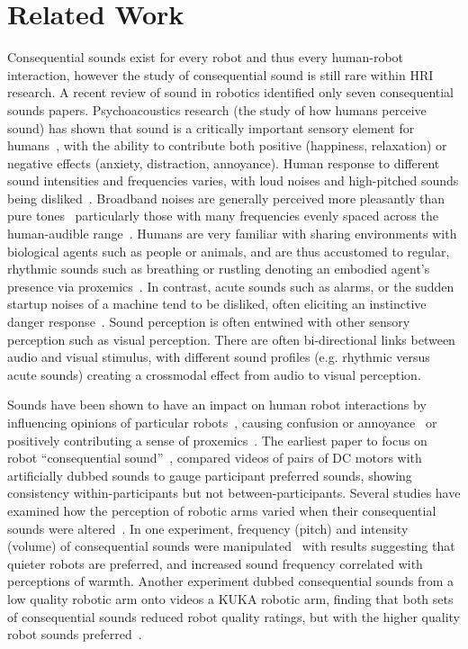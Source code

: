 \section{Related Work}
\label{sec:related-works}
Consequential sounds exist for every robot and thus every human-robot interaction, however the study of consequential sound is still rare within HRI research. A recent review of sound in robotics identified only seven consequential sounds papers\cite{Zhang2023}. Psychoacoustics research (the study of how humans perceive sound) has shown that sound is a critically important sensory element for humans~\cite{Jouaiti2019}, with the ability to contribute both positive (happiness, relaxation) or negative effects (anxiety, distraction, annoyance). Human response to different sound intensities and frequencies varies, with loud noises and high-pitched sounds being disliked~\cite{Cha2018}. Broadband noises are generally perceived more pleasantly than pure tones~\cite{Fastl2007a} particularly those with many frequencies evenly spaced across the human-audible range~\cite{Cha2018}. Humans are very familiar with sharing environments with biological agents such as people or animals, and are thus accustomed to regular, rhythmic sounds such as breathing or rustling denoting an embodied agent's presence via proxemics~\cite{Jouaiti2019,Trovato2018}. In contrast, acute sounds such as alarms, or the sudden startup noises of a machine tend to be disliked, often eliciting an instinctive danger response~\cite{Jouaiti2019}. Sound perception is often entwined with other sensory perception such as visual perception. There are often bi-directional links between audio and visual stimulus\cite{DeGelder2000}, with different sound profiles (e.g. rhythmic versus acute sounds) creating a crossmodal effect from audio to visual perception\cite{Vroomen2000}.

Sounds have been shown to have an impact on human robot interactions by influencing opinions of particular robots~\cite{Moore2018,Frederiksen2019,Frederiksen2020,Cha2018,Song2017}, causing confusion or annoyance~\cite{DePaivaVianna2015,Schute2007,Moore2017} or positively contributing a sense of proxemics~\cite{Cha2018,Trovato2018}. The earliest paper to focus on robot ``consequential sound''~\cite{Moore2017}, compared videos of pairs of DC motors with artificially dubbed sounds to gauge participant preferred sounds, showing consistency within-participants but not between-participants. Several studies have examined how the perception of robotic arms varied when their consequential sounds were altered~\cite{Zhang2021,Tennent2017}. In one experiment, frequency (pitch) and intensity (volume) of consequential sounds were manipulated~\cite{Zhang2021} with results suggesting that quieter robots are preferred, and increased sound frequency correlated with perceptions of warmth. Another experiment dubbed consequential sounds from a low quality robotic arm onto videos a KUKA robotic arm, finding that both sets of consequential sounds reduced robot quality ratings, but with the higher quality robot sounds preferred~\cite{Tennent2017}.

